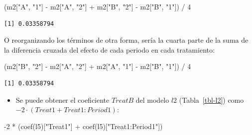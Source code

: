 \documentclass[
  12pt,
  a4paper,
  extrafontsizes,
  onecolumn,
  openright,
  table]{memoir}
\newenvironment{Shaded}{\begin{snugshade}}{\end{snugshade}}
\newcommand{\DecValTok}[1]{\textcolor[rgb]{0.68,0.00,0.00}{#1}}
\newcommand{\FunctionTok}[1]{\textcolor[rgb]{0.28,0.35,0.67}{#1}}
\newcommand{\NormalTok}[1]{\textcolor[rgb]{0.00,0.23,0.31}{#1}}
\newcommand{\SpecialCharTok}[1]{\textcolor[rgb]{0.37,0.37,0.37}{#1}}
\newcommand{\StringTok}[1]{\textcolor[rgb]{0.13,0.47,0.30}{#1}}
\providecommand{\tightlist}{%
  \setlength{\itemsep}{0pt}\setlength{\parskip}{0pt}}\usepackage{longtable,booktabs,array}
\begin{document}
\scriptsize

\begin{Shaded}
\begin{Highlighting}[]
\NormalTok{(m2[}\StringTok{"A"}\NormalTok{, }\StringTok{"1"}\NormalTok{] }\SpecialCharTok{{-}}\NormalTok{ m2[}\StringTok{"A"}\NormalTok{, }\StringTok{"2"}\NormalTok{] }\SpecialCharTok{+}\NormalTok{ m2[}\StringTok{"B"}\NormalTok{, }\StringTok{"2"}\NormalTok{] }\SpecialCharTok{{-}}\NormalTok{ m2[}\StringTok{"B"}\NormalTok{, }\StringTok{"1"}\NormalTok{]) }\SpecialCharTok{/} \DecValTok{4}
\end{Highlighting}
\end{Shaded}

\begin{verbatim}
[1] 0.03358794
\end{verbatim}

\normalsize

O reorganizando los términos de otra forma, sería la cuarta parte de la
suma de la diferencia cruzada del efecto de cada periodo en cada
tratamiento:

\scriptsize

\begin{Shaded}
\begin{Highlighting}[]
\NormalTok{(m2[}\StringTok{"B"}\NormalTok{, }\StringTok{"2"}\NormalTok{] }\SpecialCharTok{{-}}\NormalTok{ m2[}\StringTok{"A"}\NormalTok{, }\StringTok{"2"}\NormalTok{] }\SpecialCharTok{+}\NormalTok{ m2[}\StringTok{"A"}\NormalTok{, }\StringTok{"1"}\NormalTok{] }\SpecialCharTok{{-}}\NormalTok{ m2[}\StringTok{"B"}\NormalTok{, }\StringTok{"1"}\NormalTok{]) }\SpecialCharTok{/} \DecValTok{4}
\end{Highlighting}
\end{Shaded}

\begin{verbatim}
[1] 0.03358794
\end{verbatim}

\normalsize

\begin{itemize}
\tightlist
\item
  Se puede obtener el coeficiente \(TreatB\) del modelo \(l2\)
  (Tabla~\ref{tbl-l2}) como \(-2 \cdot (Treat1 + Treat1:Period1)\):
\end{itemize}

\scriptsize

\begin{Shaded}
\begin{Highlighting}[]
\SpecialCharTok{{-}}\DecValTok{2} \SpecialCharTok{*}\NormalTok{ (}\FunctionTok{coef}\NormalTok{(l5)[}\StringTok{"Treat1"}\NormalTok{] }\SpecialCharTok{+} \FunctionTok{coef}\NormalTok{(l5)[}\StringTok{"Treat1:Period1"}\NormalTok{])}
\end{Highlighting}
\end{Shaded}
\end{document}
